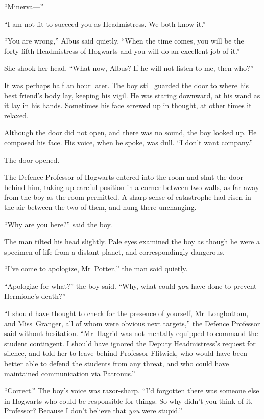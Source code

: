 “Minerva—”

“I am not fit to succeed you as Headmistress. We both know it.”

“You are wrong,” Albus said quietly.
“When the time comes, you will be the forty-fifth Headmistress of Hogwarts and you will do an excellent job of it.”

She shook her head.
“What now, Albus? If he will not listen to me, then who?”

\later

It was perhaps half an hour later. The boy still guarded the door to where his best friend’s body lay, keeping his vigil. He was staring downward, at his wand as it lay in his hands. Sometimes his face screwed up in thought, at other times it relaxed.

Although the door did not open, and there was no sound, the boy looked up. He composed his face. His voice, when he spoke, was dull.
“I don’t want company.”

The door opened.

The Defence Professor of Hogwarts entered into the room and shut the door behind him, taking up careful position in a corner between two walls, as far away from the boy as the room permitted. A sharp sense of catastrophe had risen in the air between the two of them, and hung there unchanging.

“Why are you here?” said the boy.

The man tilted his head slightly. Pale eyes examined the boy as though he were a specimen of life from a distant planet, and correspondingly dangerous.

“I’ve come to apologize, Mr~Potter,” the man said quietly.

“Apologize for what?” the boy said.
“Why, what could \emph{you} have done to prevent Hermione’s death?”

“I should have thought to check for the presence of yourself, Mr~Longbottom, and Miss~Granger, all of whom were obvious next targets,” the Defence Professor said without hesitation.
“Mr~Hagrid was not mentally equipped to command the student contingent. I should have ignored the Deputy Headmistress’s request for silence, and told her to leave behind Professor Flitwick, who would have been better able to defend the students from any threat, and who could have maintained communication via Patronus.”

“Correct.” The boy’s voice was razor-sharp.
“I’d forgotten there was someone else in Hogwarts who could be responsible for things. So why didn’t you think of it, Professor? Because I don’t believe that \emph{you} were stupid.”

